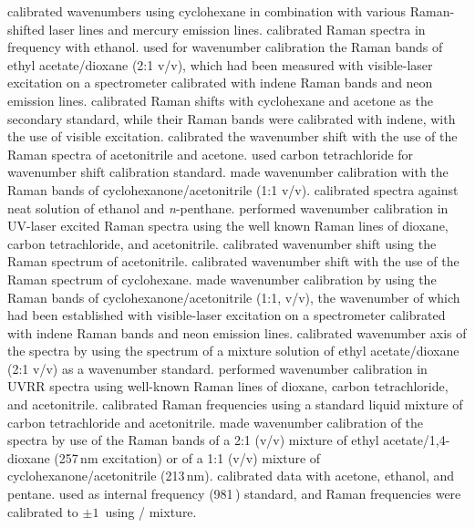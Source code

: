 \textcite{Myers1988} calibrated wavenumbers using cyclohexane in
combination with various  Raman-shifted laser lines and mercury
emission lines. \textcite{Su1990} calibrated Raman spectra in frequency with
ethanol. \textcite{Toyama1991, Toyama1996} used for wavenumber calibration
the Raman bands of ethyl acetate/dioxane (2:1 v/v), which had been measured
with visible-laser excitation on a spectrometer calibrated with indene Raman
bands and neon emission lines. \textcite{Kaminaka1992} calibrated Raman
shifts with cyclohexane and acetone as the secondary standard, while their
Raman bands were calibrated with indene, with the use of visible excitation.
\textcite{Benson1992} calibrated the wavenumber shift with the use of the
Raman spectra of acetonitrile and acetone. \textcite{Benson1993} used carbon
tetrachloride for wavenumber shift calibration standard.
\textcite{Hashimoto1993} made wavenumber calibration with the Raman bands of
cyclohexanone/acetonitrile (1:1 v/v). \textcite{Mukerji1995} calibrated spectra
against neat solution of ethanol and \textit{n}-penthane.
\textcite{Russell1995} performed wavenumber calibration in UV-laser excited
Raman spectra using the well known Raman lines of dioxane, carbon
tetrachloride, and acetonitrile. \textcite{Gustafson1988} calibrated
wavenumber shift using the Raman spectrum of acetonitrile.
\textcite{Leonard1994} calibrated wavenumber shift with the use of the Raman
spectrum of cyclohexane. \textcite{Takeuchi1990} made wavenumber calibration
by using the Raman bands of cyclohexanone/acetonitrile (1:1, v/v), the
wavenumber of which had been established with visible-laser excitation on a
spectrometer calibrated with indene Raman bands and neon emission lines.
\textcite{Takeuchi1995} calibrated wavenumber axis of the spectra by using
the spectrum of a mixture solution of ethyl acetate/dioxane (2:1 v/v) as a
wavenumber standard. \textcite{Tuma1995} performed wavenumber
calibration in UVRR spectra using well-known Raman lines of dioxane, carbon
tetrachloride, and acetonitrile. \textcite{Wen1997} calibrated Raman
frequencies using a standard liquid mixture of carbon tetrachloride and
acetonitrile. \textcite{Fujimoto1998} made wavenumber calibration of the
spectra by use of the Raman bands of a 2:1 (v/v) mixture of ethyl
acetate/1,4-dioxane (257\,nm excitation) or of a 1:1 (v/v) mixture of
cyclohexanone/acetonitrile (213\,nm). \textcite{Mukerji1998} calibrated data
with acetone, ethanol, and pentane. \textcite{Wen1998} used  as
internal frequency (981\,\icm) standard, and Raman frequencies were
calibrated to $\pm1 $\,\icm{} using / mixture.
